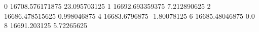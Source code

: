 0 16708.576171875 23.095703125
1 16692.693359375 7.212890625
2 16686.478515625 0.998046875
4 16683.6796875 -1.80078125
6 16685.48046875 0.0
8 16691.203125 5.72265625
